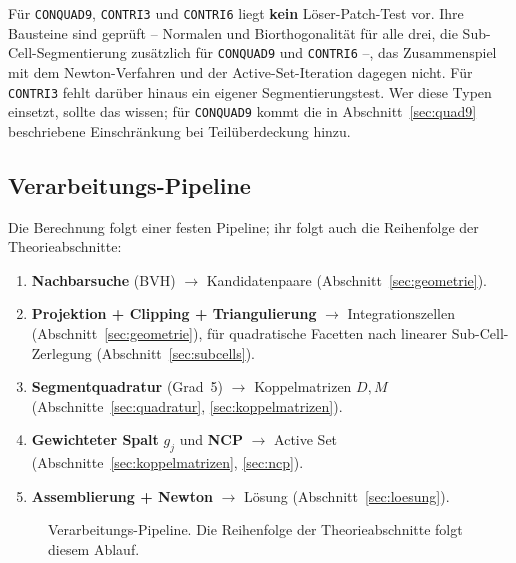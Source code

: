 \documentclass[a4paper,11pt]{article}
\def\bm#1{#1}%
\def\tilde#1{#1}%
\newcommand{\code}[1]{\texttt{\small #1}}
\begin{document}
Für \code{CONQUAD9}, \code{CONTRI3} und \code{CONTRI6} liegt \textbf{kein} Löser-Patch-Test vor.
Ihre Bausteine sind geprüft -- Normalen und Biorthogonalität für alle drei, die
Sub-Cell-Segmentierung zusätzlich für \code{CONQUAD9} und \code{CONTRI6} --, das
Zusammenspiel mit dem Newton-Verfahren und der Active-Set-Iteration dagegen nicht. Für
\code{CONTRI3} fehlt darüber hinaus ein eigener Segmentierungstest. Wer diese Typen einsetzt,
sollte das wissen; für \code{CONQUAD9} kommt die in Abschnitt~\ref{sec:quad9} beschriebene
Einschränkung bei Teilüberdeckung hinzu.

\subsection{Verarbeitungs-Pipeline}
Die Berechnung folgt einer festen Pipeline; ihr folgt auch die Reihenfolge der
Theorieabschnitte:
\begin{enumerate}\itemsep2pt
  \item \textbf{Nachbarsuche} (BVH) $\to$ Kandidatenpaare (Abschnitt~\ref{sec:geometrie}).
  \item \textbf{Projektion + Clipping + Triangulierung} $\to$ Integrationszellen
        (Abschnitt~\ref{sec:geometrie}), für quadratische Facetten nach linearer Sub-Cell-Zerlegung
        (Abschnitt~\ref{sec:subcells}).
  \item \textbf{Segmentquadratur} (Grad~5) $\to$ Koppelmatrizen $\bm D,\bm M$
        (Abschnitte~\ref{sec:quadratur}, \ref{sec:koppelmatrizen}).
  \item \textbf{Gewichteter Spalt} $\tilde g_j$ und \textbf{NCP} $\to$ Active Set
        (Abschnitte~\ref{sec:koppelmatrizen}, \ref{sec:ncp}).
  \item \textbf{Assemblierung + Newton} $\to$ Lösung (Abschnitt~\ref{sec:loesung}).
\end{enumerate}

\begin{figure}[htbp]
\centering
{}
\caption[Verarbeitungs-Pipeline des Mortar-Kontakts]{Verarbeitungs-Pipeline. Die Reihenfolge der
Theorieabschnitte folgt diesem Ablauf.}
\label{fig:pipeline}
\end{figure}
\end{document}
